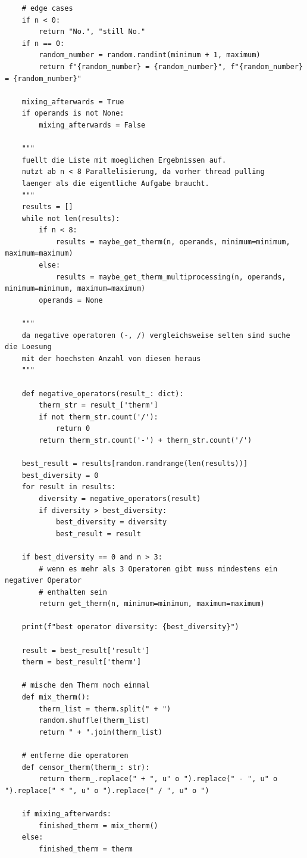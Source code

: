 \documentclass[a4paper,10pt,ngerman]{scrartcl}
\begin{document}
\begin{lstlisting}
    # edge cases
    if n < 0:
        return "No.", "still No."
    if n == 0:
        random_number = random.randint(minimum + 1, maximum)
        return f"{random_number} = {random_number}", f"{random_number} = {random_number}"

    mixing_afterwards = True
    if operands is not None:
        mixing_afterwards = False

    """
    fuellt die Liste mit moeglichen Ergebnissen auf.
    nutzt ab n < 8 Parallelisierung, da vorher thread pulling 
    laenger als die eigentliche Aufgabe braucht.
    """
    results = []
    while not len(results):
        if n < 8:
            results = maybe_get_therm(n, operands, minimum=minimum, maximum=maximum)
        else:
            results = maybe_get_therm_multiprocessing(n, operands, minimum=minimum, maximum=maximum)
        operands = None

    """
    da negative operatoren (-, /) vergleichsweise selten sind suche die Loesung
    mit der hoechsten Anzahl von diesen heraus
    """

    def negative_operators(result_: dict):
        therm_str = result_['therm']
        if not therm_str.count('/'):
            return 0
        return therm_str.count('-') + therm_str.count('/')

    best_result = results[random.randrange(len(results))]
    best_diversity = 0
    for result in results:
        diversity = negative_operators(result)
        if diversity > best_diversity:
            best_diversity = diversity
            best_result = result

    if best_diversity == 0 and n > 3:
        # wenn es mehr als 3 Operatoren gibt muss mindestens ein negativer Operator
        # enthalten sein
        return get_therm(n, minimum=minimum, maximum=maximum)

    print(f"best operator diversity: {best_diversity}")

    result = best_result['result']
    therm = best_result['therm']

    # mische den Therm noch einmal
    def mix_therm():
        therm_list = therm.split(" + ")
        random.shuffle(therm_list)
        return " + ".join(therm_list)

    # entferne die operatoren
    def censor_therm(therm_: str):
        return therm_.replace(" + ", u" o ").replace(" - ", u" o ").replace(" * ", u" o ").replace(" / ", u" o ")

    if mixing_afterwards:
        finished_therm = mix_therm()
    else:
        finished_therm = therm


\end{lstlisting}
\end{document}
